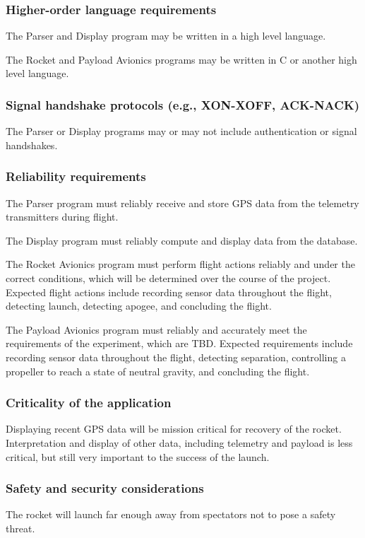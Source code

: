 \documentclass[onecolumn, draftclsnofoot, 10pt, compsoc]{IEEEtran}
\begin{document}
\subsubsection{Higher-order language requirements}
The Parser and Display program may be written in a high level language.

The Rocket and Payload Avionics programs may be written in C or another high level language.

\subsubsection{Signal handshake protocols (e.g., XON-XOFF, ACK-NACK)}
The Parser or Display programs may or may not include authentication or signal handshakes.

\subsubsection{Reliability requirements}
The Parser program must reliably receive and store GPS data from the telemetry transmitters during flight.

The Display program must reliably compute and display data from the database.

The Rocket Avionics program must perform flight actions reliably and under the correct conditions, which will be determined over the course of the project.  Expected flight actions include recording sensor data throughout the flight, detecting launch, detecting apogee, and concluding the flight.

The Payload Avionics program must reliably and accurately meet the requirements of the experiment, which are TBD.  Expected requirements include recording sensor data throughout the flight, detecting separation, controlling a propeller to reach a state of neutral gravity, and concluding the flight.

\subsubsection{Criticality of the application}
Displaying recent GPS data will be mission critical for recovery of the rocket. Interpretation and display of other data, including telemetry and payload is less critical, but still very important to the success of the launch.

\subsubsection{Safety and security considerations}
The rocket will launch far enough away from spectators not to pose a safety threat.
\end{document}
